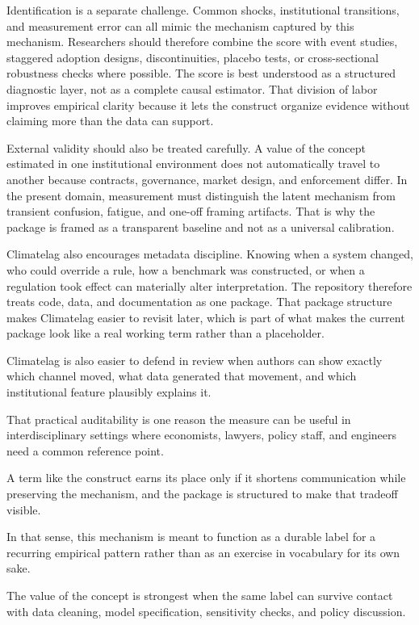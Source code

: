 \documentclass[12pt]{article}
\begin{document}
Identification is a separate challenge. Common shocks, institutional transitions, and measurement error can all mimic the mechanism captured by this mechanism. Researchers should therefore combine the score with event studies, staggered adoption designs, discontinuities, placebo tests, or cross-sectional robustness checks where possible. The score is best understood as a structured diagnostic layer, not as a complete causal estimator. That division of labor improves empirical clarity because it lets the construct organize evidence without claiming more than the data can support.

External validity should also be treated carefully. A value of the concept estimated in one institutional environment does not automatically travel to another because contracts, governance, market design, and enforcement differ. In the present domain, measurement must distinguish the latent mechanism from transient confusion, fatigue, and one-off framing artifacts. That is why the package is framed as a transparent baseline and not as a universal calibration.

Climatelag also encourages metadata discipline. Knowing when a system changed, who could override a rule, how a benchmark was constructed, or when a regulation took effect can materially alter interpretation. The repository therefore treats code, data, and documentation as one package. That package structure makes Climatelag easier to revisit later, which is part of what makes the current package look like a real working term rather than a placeholder.

Climatelag is also easier to defend in review when authors can show exactly which channel moved, what data generated that movement, and which institutional feature plausibly explains it.

That practical auditability is one reason the measure can be useful in interdisciplinary settings where economists, lawyers, policy staff, and engineers need a common reference point.

A term like the construct earns its place only if it shortens communication while preserving the mechanism, and the package is structured to make that tradeoff visible.

In that sense, this mechanism is meant to function as a durable label for a recurring empirical pattern rather than as an exercise in vocabulary for its own sake.

The value of the concept is strongest when the same label can survive contact with data cleaning, model specification, sensitivity checks, and policy discussion.
\end{document}
